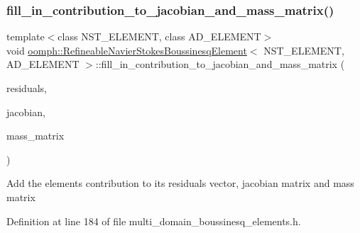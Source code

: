 \subsubsection{\texorpdfstring{fill\+\_\+in\+\_\+contribution\+\_\+to\+\_\+jacobian\+\_\+and\+\_\+mass\+\_\+matrix()}{fill\_in\_contribution\_to\_jacobian\_and\_mass\_matrix()}}
{\footnotesize\ttfamily template$<$class N\+S\+T\+\_\+\+E\+L\+E\+M\+E\+NT, class A\+D\+\_\+\+E\+L\+E\+M\+E\+NT$>$ \\
void \hyperlink{classoomph_1_1RefineableNavierStokesBoussinesqElement}{oomph\+::\+Refineable\+Navier\+Stokes\+Boussinesq\+Element}$<$ N\+S\+T\+\_\+\+E\+L\+E\+M\+E\+NT, A\+D\+\_\+\+E\+L\+E\+M\+E\+NT $>$\+::fill\+\_\+in\+\_\+contribution\+\_\+to\+\_\+jacobian\+\_\+and\+\_\+mass\+\_\+matrix (\begin{DoxyParamCaption}\item[{Vector$<$ double $>$ \&}]{residuals,  }\item[{Dense\+Matrix$<$ double $>$ \&}]{jacobian,  }\item[{Dense\+Matrix$<$ double $>$ \&}]{mass\+\_\+matrix }\end{DoxyParamCaption})\hspace{0.3cm}{\ttfamily [inline]}}

Add the element\textquotesingle{}s contribution to its residuals vector, jacobian matrix and mass matrix 

Definition at line 184 of file multi\+\_\+domain\+\_\+boussinesq\+\_\+elements.\+h.

\mbox{\label{classoomph_1_1RefineableNavierStokesBoussinesqElement_a9609dc454ef3d29b1e256fa32fb2c665}} 
